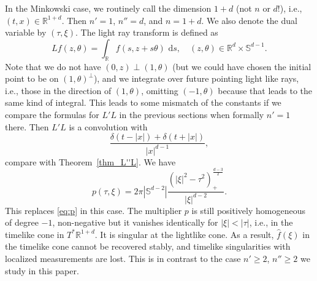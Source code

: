 \documentclass[11pt]{amsart}
\theoremstyle{definition}
\theoremstyle{remark}
\numberwithin{equation}{section}
\newcommand{\be}[1]{\begin{equation}\label{#1}}
\newcommand{\ee}{\end{equation}}
\newcommand{\rb}{\mathbb{R}}
\renewcommand{\d}{\,\mathrm{d}}
\renewcommand{\sb}{\mathbb{S}}
\begin{document}
In the Minkowski case, we routinely call the dimension $1+d$ (not $n$ or $d$!), i.e., $(t,x)\in \rb^{1+d}$. Then $n'=1$, $n''=d$, and $n=1+d$. We also denote the dual variable by $(\tau,\xi)$.  The light ray transform is defined as
\be{MA_light_Ldef}
L f(z,\theta) = \int_\rb   f(s,z+s\theta)\,\d s, \quad (z,\theta) \in\rb^d\times \sb^{d-1}.
\ee
 Note that we do not have $(0,z)\perp(1,\theta)$ (but we could have chosen the initial point to be on $(1,\theta)^\perp$), and we integrate over future pointing light like rays, i.e., those in the direction of $(1,\theta)$, omitting $(-1,\theta)$ because that leads to the same kind of integral. This leads to some mismatch of the constants if we compare the formulas for $L'L$ in the previous sections when formally $n'=1$ there. Then $L'L$ is a convolution with
 \[
 \frac{\delta(t-|x|) +\delta(t+|x|) }{|x|^{d-1}},
 \]
compare with Theorem~\ref{thm_L''L}. We have
\[
p(\tau, \xi) =  2\pi|\sb^{d-2}|  \frac{(|\xi|^2-\tau^2)_+^\frac{d-3}2} {|\xi|^{d-2}}  .
 \]
 This replaces \eqref{eq:p} in this case. The multiplier $p$ is still positively homogeneous of degree $-1$, non-negative but it vanishes identically for $|\xi|<|\tau|$, i.e., in the timelike cone in $T^*\rb^{1+d}$. It is singular at the lightlike cone. As a result, $\hat f(\xi)$ in the timelike cone cannot be recovered stably, and timelike singularities with localized measurements are lost. This is in contrast to the case $n'\ge2$, $n''\ge2$ we study in this paper. 
\end{document}
